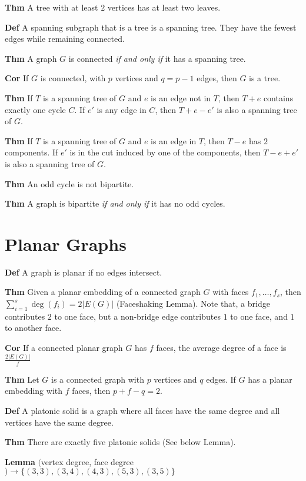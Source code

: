 \documentclass{article}
\begin{document}
\textbf{Thm} A tree with at least $2$ vertices has at least two leaves. 

\textbf{Def} A spanning subgraph that is a tree is a spanning tree. They have the fewest edges while remaining connected. 

\textbf{Thm} A graph $G$ is connected \textit{if and only if} it has a spanning tree. 

\textbf{Cor} If $G$ is connected, with $p$ vertices and $q = p-1$ edges, then $G$ is a tree. 

\textbf{Thm} If $T$ is a spanning tree of $G$ and $e$ is an edge not in $T$, then $T + e$ contains exactly one cycle $C$. If $e'$ is any edge in $C$, then $T + e - e'$ is also a spanning tree of $G$. 

\textbf{Thm} If $T$ is a spanning tree of $G$ and $e$ is an edge in $T$, then $T - e$ has $2$ components. If $e'$ is in the cut induced by one of the components, then $T - e + e'$ is also a spanning tree of $G$. 

\textbf{Thm} An odd cycle is not bipartite. 

\textbf{Thm} A graph is bipartite \textit{if and only if} it has no odd cycles. 

\section{Planar Graphs}

\textbf{Def} A graph is planar if no edges intersect. 

\textbf{Thm} Given a planar embedding of a connected graph $G$ with faces $f_1, \ldots, f_s$, then $\sum_{i=1}^s\deg(f_i) = 2|E(G)|$ (Faceshaking Lemma). Note that, a bridge contributes $2$ to one face, but a non-bridge edge contributes $1$ to one face, and $1$ to another face.

\textbf{Cor} If a connected planar graph $G$ has $f$ faces, the average degree of a face is $\frac{2|E(G)|}{f}$

\textbf{Thm} Let $G$ is a connected graph with $p$ vertices and $q$ edges. If $G$ has a planar embedding with $f$ faces, then $p + f - q = 2$.

\textbf{Def} A platonic solid is a graph where all faces have the same degree and all vertices have the same degree. 

\textbf{Thm} There are exactly five platonic solids (See below Lemma).

\textbf{Lemma} $($vertex degree, face degree$) \to \{(3,3),(3,4),(4,3),(5,3),(3,5)\}$
\end{document}
